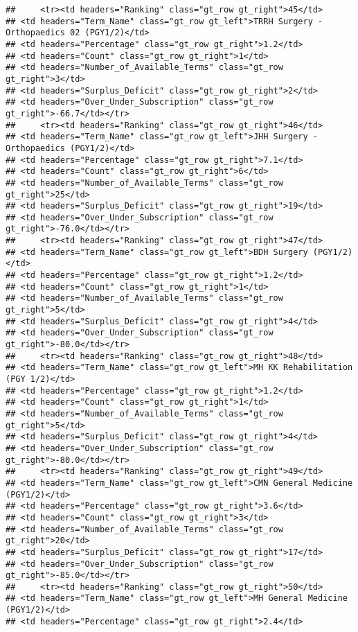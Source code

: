 \documentclass[
]{article}
\begin{document}
\begin{verbatim}
##     <tr><td headers="Ranking" class="gt_row gt_right">45</td>
## <td headers="Term_Name" class="gt_row gt_left">TRRH Surgery - Orthopaedics 02 (PGY1/2)</td>
## <td headers="Percentage" class="gt_row gt_right">1.2</td>
## <td headers="Count" class="gt_row gt_right">1</td>
## <td headers="Number_of_Available_Terms" class="gt_row gt_right">3</td>
## <td headers="Surplus_Deficit" class="gt_row gt_right">2</td>
## <td headers="Over_Under_Subscription" class="gt_row gt_right">-66.7</td></tr>
##     <tr><td headers="Ranking" class="gt_row gt_right">46</td>
## <td headers="Term_Name" class="gt_row gt_left">JHH Surgery - Orthopaedics (PGY1/2)</td>
## <td headers="Percentage" class="gt_row gt_right">7.1</td>
## <td headers="Count" class="gt_row gt_right">6</td>
## <td headers="Number_of_Available_Terms" class="gt_row gt_right">25</td>
## <td headers="Surplus_Deficit" class="gt_row gt_right">19</td>
## <td headers="Over_Under_Subscription" class="gt_row gt_right">-76.0</td></tr>
##     <tr><td headers="Ranking" class="gt_row gt_right">47</td>
## <td headers="Term_Name" class="gt_row gt_left">BDH Surgery (PGY1/2)</td>
## <td headers="Percentage" class="gt_row gt_right">1.2</td>
## <td headers="Count" class="gt_row gt_right">1</td>
## <td headers="Number_of_Available_Terms" class="gt_row gt_right">5</td>
## <td headers="Surplus_Deficit" class="gt_row gt_right">4</td>
## <td headers="Over_Under_Subscription" class="gt_row gt_right">-80.0</td></tr>
##     <tr><td headers="Ranking" class="gt_row gt_right">48</td>
## <td headers="Term_Name" class="gt_row gt_left">MH KK Rehabilitation (PGY 1/2)</td>
## <td headers="Percentage" class="gt_row gt_right">1.2</td>
## <td headers="Count" class="gt_row gt_right">1</td>
## <td headers="Number_of_Available_Terms" class="gt_row gt_right">5</td>
## <td headers="Surplus_Deficit" class="gt_row gt_right">4</td>
## <td headers="Over_Under_Subscription" class="gt_row gt_right">-80.0</td></tr>
##     <tr><td headers="Ranking" class="gt_row gt_right">49</td>
## <td headers="Term_Name" class="gt_row gt_left">CMN General Medicine (PGY1/2)</td>
## <td headers="Percentage" class="gt_row gt_right">3.6</td>
## <td headers="Count" class="gt_row gt_right">3</td>
## <td headers="Number_of_Available_Terms" class="gt_row gt_right">20</td>
## <td headers="Surplus_Deficit" class="gt_row gt_right">17</td>
## <td headers="Over_Under_Subscription" class="gt_row gt_right">-85.0</td></tr>
##     <tr><td headers="Ranking" class="gt_row gt_right">50</td>
## <td headers="Term_Name" class="gt_row gt_left">MH General Medicine (PGY1/2)</td>
## <td headers="Percentage" class="gt_row gt_right">2.4</td>

\end{verbatim}
\end{document}
